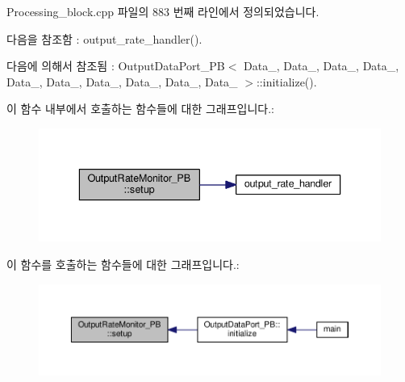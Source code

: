 Processing\+\_\+block.\+cpp 파일의 883 번째 라인에서 정의되었습니다.



다음을 참조함 \+:  output\+\_\+rate\+\_\+handler().



다음에 의해서 참조됨 \+:  Output\+Data\+Port\+\_\+\+P\+B$<$ Data\+\_, Data\+\_, Data\+\_, Data\+\_, Data\+\_, Data\+\_, Data\+\_, Data\+\_, Data\+\_, Data\+\_ $>$\+::initialize().



이 함수 내부에서 호출하는 함수들에 대한 그래프입니다.\+:\nopagebreak
\begin{figure}[H]
\begin{center}
\leavevmode
\includegraphics[width=336pt]{classOutputRateMonitor__PB_a6451be96235fc9eea26d621337c63ecd_cgraph}
\end{center}
\end{figure}




이 함수를 호출하는 함수들에 대한 그래프입니다.\+:\nopagebreak
\begin{figure}[H]
\begin{center}
\leavevmode
\includegraphics[width=350pt]{classOutputRateMonitor__PB_a6451be96235fc9eea26d621337c63ecd_icgraph}
\end{center}
\end{figure}


